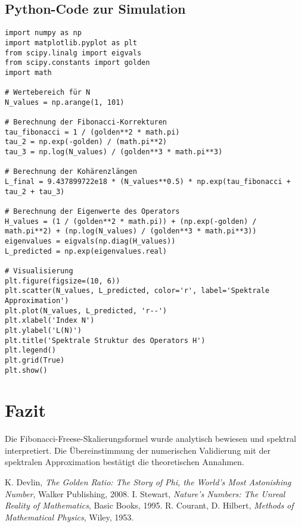 \documentclass[a4paper,12pt]{article}
\begin{document}
\subsection{Python-Code zur Simulation}
\begin{verbatim}
import numpy as np
import matplotlib.pyplot as plt
from scipy.linalg import eigvals
from scipy.constants import golden
import math

# Wertebereich für N
N_values = np.arange(1, 101)

# Berechnung der Fibonacci-Korrekturen
tau_fibonacci = 1 / (golden**2 * math.pi)
tau_2 = np.exp(-golden) / (math.pi**2)
tau_3 = np.log(N_values) / (golden**3 * math.pi**3)

# Berechnung der Kohärenzlängen
L_final = 9.437899722e18 * (N_values**0.5) * np.exp(tau_fibonacci + tau_2 + tau_3)

# Berechnung der Eigenwerte des Operators
H_values = (1 / (golden**2 * math.pi)) + (np.exp(-golden) / math.pi**2) + (np.log(N_values) / (golden**3 * math.pi**3))
eigenvalues = eigvals(np.diag(H_values))
L_predicted = np.exp(eigenvalues.real)

# Visualisierung
plt.figure(figsize=(10, 6))
plt.scatter(N_values, L_predicted, color='r', label='Spektrale Approximation')
plt.plot(N_values, L_predicted, 'r--')
plt.xlabel('Index N')
plt.ylabel('L(N)')
plt.title('Spektrale Struktur des Operators H')
plt.legend()
plt.grid(True)
plt.show()
\end{verbatim}

\section{Fazit}
Die Fibonacci-Freese-Skalierungsformel wurde analytisch bewiesen und spektral interpretiert. Die Übereinstimmung der numerischen Validierung mit der spektralen Approximation bestätigt die theoretischen Annahmen.

\begin{thebibliography}{9}
 K. Devlin, \textit{The Golden Ratio: The Story of Phi, the World's Most Astonishing Number}, Walker Publishing, 2008.
 I. Stewart, \textit{Nature's Numbers: The Unreal Reality of Mathematics}, Basic Books, 1995.
 R. Courant, D. Hilbert, \textit{Methods of Mathematical Physics}, Wiley, 1953.
\end{thebibliography}
\end{document}
